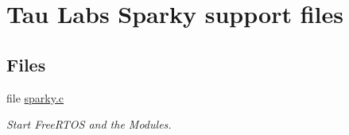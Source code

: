 \hypertarget{group___sparky}{\section{\-Tau \-Labs \-Sparky support files}
\label{group___sparky}
}
\subsection*{\-Files}
\begin{DoxyCompactItemize}
\item 
file \hyperlink{sparky_8c}{sparky.\-c}
\begin{DoxyCompactList}\small\item\em \-Start \-Free\-R\-T\-O\-S and the \-Modules. \end{DoxyCompactList}\end{DoxyCompactItemize}

